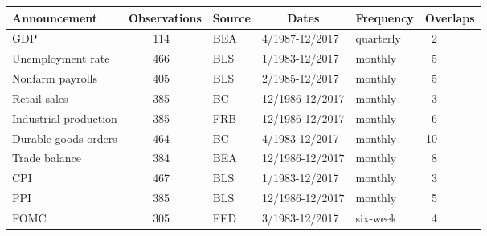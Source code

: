 \begin{tabular}{lrlllr}\toprule\midrule  
 Announcement &  \multicolumn{1}{c}{Observations} & Source & \multicolumn{1}{c}{Dates} & Frequency & \multicolumn{1}{c}{Overlaps}  \\ \midrule  
 GDP &   114 \ \ \ \ \ & BEA & 4/1987-12/2017 & quarterly &  2 \ \ \ \ \ \ \\  
 Unemployment rate &   466 \ \ \ \ \ & BLS & 1/1983-12/2017 & monthly &  5 \ \ \ \ \ \ \\   
 Nonfarm payrolls &   405 \ \ \ \ \ & BLS & 2/1985-12/2017 & monthly &  5 \ \ \ \ \ \ \\   
 Retail sales &   385 \ \ \ \ \ & BC & 12/1986-12/2017 & monthly &  3 \ \ \ \ \ \ \\   
 Industrial production &   385 \ \ \ \ \ & FRB & 12/1986-12/2017 & monthly &  6 \ \ \ \ \ \ \\   
 Durable goods orders &   464 \ \ \ \ \ & BC & 4/1983-12/2017 & monthly & 10 \ \ \ \ \ \ \\  
 Trade balance &   384 \ \ \ \ \ & BEA & 12/1986-12/2017 & monthly &  8 \ \ \ \ \ \ \\   
 CPI &   467 \ \ \ \ \ & BLS & 1/1983-12/2017 & monthly &  3 \ \ \ \ \ \ \\   
 PPI &   385 \ \ \ \ \ & BLS & 12/1986-12/2017 & monthly &  5 \ \ \ \ \ \ \\   
 FOMC &   305 \ \ \ \ \ & FED & 3/1983-12/2017 & six-week &  4 \ \ \ \ \ \ \\  
\midrule\bottomrule 
\end{tabular}
